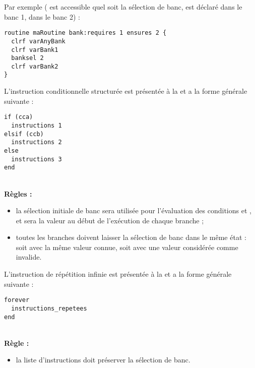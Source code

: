 Par exemple ( est accessible quel soit la sélection de banc,  est déclaré dans le banc 1,  dans le banc 2) :
\begin{lstlisting}[language=piccolo]
routine maRoutine bank:requires 1 ensures 2 {
  clrf varAnyBank
  clrf varBank1
  banksel 2
  clrf varBank2
}
\end{lstlisting}










L'instruction conditionnelle structurée est présentée à la  et a la forme générale suivante :

\begin{lstlisting}[language=piccolo]
if (cca)
  instructions 1
elsif (ccb)
  instructions 2
else
  instructions 3
end
\end{lstlisting}

~\\
\textbf{Règles :}
\begin{itemize}
  \item la sélection initiale de banc sera utilisée pour l’évaluation des conditions  et , et sera la valeur au début de l'exécution de chaque branche ;
  \item toutes les branches doivent laisser la sélection de banc dans le même état : soit avec la même valeur connue, soit avec une valeur considérée comme invalide.
\end{itemize}



L'instruction de répétition infinie est présentée à la  et a la forme générale suivante :

\begin{lstlisting}[language=piccolo]
forever
  instructions_repetees
end
\end{lstlisting}

~\\
\textbf{Règle :}
\begin{itemize}
  \item la liste d'instructions  doit préserver la sélection de banc.
\end{itemize}



